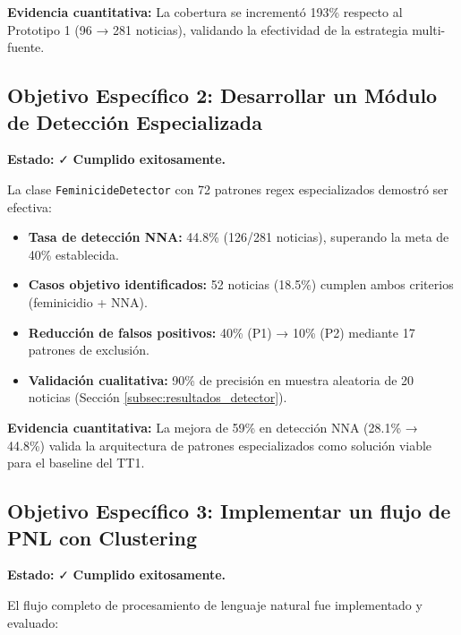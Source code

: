 \textbf{Evidencia cuantitativa:} La cobertura se incrementó 193\% respecto al Prototipo 1 (96 → 281 noticias), validando la efectividad de la estrategia multi-fuente.

\subsection{Objetivo Específico 2: Desarrollar un Módulo de Detección Especializada}
\label{subsec:obj2_cumplido}

\textbf{Estado:} ✓ \textbf{Cumplido exitosamente.}

La clase \texttt{FeminicideDetector} con 72 patrones regex especializados demostró ser efectiva:

\begin{itemize}
    \item \textbf{Tasa de detección NNA:} 44.8\% (126/281 noticias), superando la meta de 40\% establecida.
    \item \textbf{Casos objetivo identificados:} 52 noticias (18.5\%) cumplen ambos criterios (feminicidio + NNA).
    \item \textbf{Reducción de falsos positivos:} 40\% (P1) → 10\% (P2) mediante 17 patrones de exclusión.
    \item \textbf{Validación cualitativa:} 90\% de precisión en muestra aleatoria de 20 noticias (Sección \ref{subsec:resultados_detector}).
\end{itemize}

\textbf{Evidencia cuantitativa:} La mejora de 59\% en detección NNA (28.1\% → 44.8\%) valida la arquitectura de patrones especializados como solución viable para el baseline del TT1.

\subsection{Objetivo Específico 3: Implementar un flujo de PNL con Clustering}
\label{subsec:obj3_cumplido}

\textbf{Estado:} ✓ \textbf{Cumplido exitosamente.}

El flujo completo de procesamiento de lenguaje natural fue implementado y evaluado:

